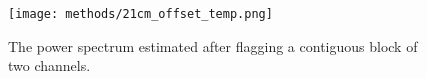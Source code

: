 \begin{figure}[th]
	\centering
	\texttt{[image: methods/21cm\_offset\_temp.png]}
	\caption[21cmFAST output]{The power spectrum estimated after flagging a contiguous block of two channels.}
	\label{fig:21cm_offset_temp}
\end{figure}
